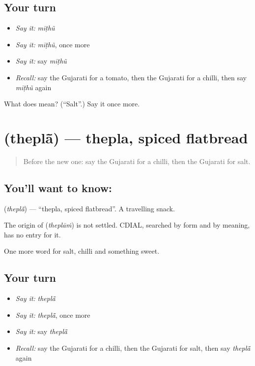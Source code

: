 \subsection*{Your turn}
\begin{itemize}
\raggedright
  \item \emph{Say it:} \emph{mīṭhũ}
  \item \emph{Say it:} \emph{mīṭhũ}, once more
  \item \emph{Say it:} say \emph{mīṭhũ}
  \item \emph{Recall:} say the Gujarati for a tomato, then the Gujarati for a chilli, then say \emph{mīṭhũ} again
\end{itemize}

\begin{tcolorbox}[breakable,colback=teal!4,colframe=teal!35!black,title={Before you move on}]
What does  mean? (\textquotedblleft{}Salt\textquotedblright{}.) Say it once more.
\end{tcolorbox}
\section[\texorpdfstring{\gu{થેપલાં} (theplā̃)}{થેપલાં (theplā̃)}]{ (theplā̃) — thepla, spiced flatbread}

\label{lesson:GU-C60-thepla}



\begin{quote}
Before the new one: say the Gujarati for a chilli, then the Gujarati for salt.
\end{quote}

\subsection*{You'll want to know: }
\textbf{} (\emph{theplā̃}) — \textquotedblleft{}thepla, spiced flatbread\textquotedblright{}. A travelling snack.

\begin{cousinweb}
The origin of \textbf{} (\emph{theplāṁ}) is not settled. CDIAL, searched by form and by meaning, has no entry for it.
\end{cousinweb}

\begin{grammarlens}[title={What you've built}]
One more word for salt, chilli and something sweet.
\end{grammarlens}

\subsection*{Your turn}
\begin{itemize}
\raggedright
  \item \emph{Say it:} \emph{theplā̃}
  \item \emph{Say it:} \emph{theplā̃}, once more
  \item \emph{Say it:} say \emph{theplā̃}
  \item \emph{Recall:} say the Gujarati for a chilli, then the Gujarati for salt, then say \emph{theplā̃} again
\end{itemize}

